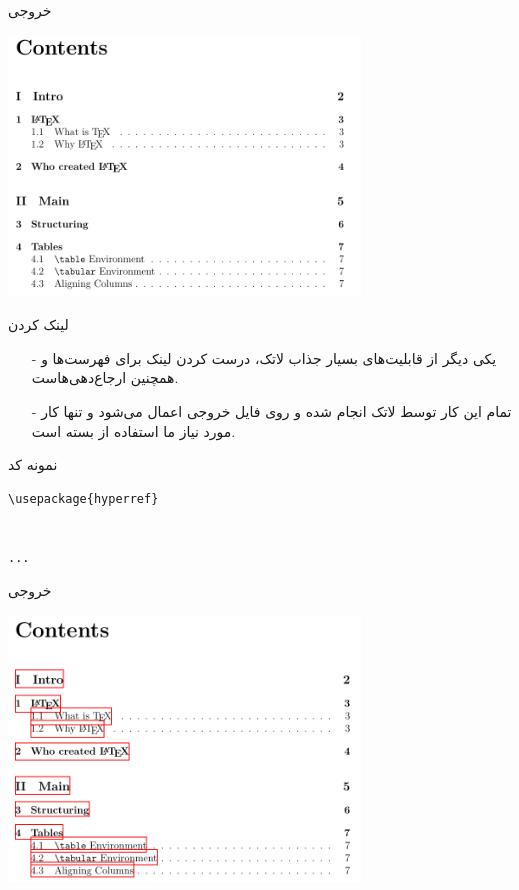 \begin{frame}{خروجی}
\begin{center}
\includegraphics[width=0.7\textwidth, height=0.8\textheight]{docs/images/tab-cont}
\end{center}
\end{frame}

\begin{frame}{لینک کردن}
\begin{itemize}\itemr
\item[-]
یکی دیگر از قابلیت‌های بسیار جذاب لاتک، درست کردن لینک برای فهرست‌ها و همچنین ارجاع‌دهی‌هاست.

\item[-] 
تمام این کار توسط لاتک انجام شده و روی فایل  خروجی اعمال می‌شود و تنها کار مورد نیاز ما استفاده از بسته 
است.
\end{itemize}
\end{frame}

\begin{frame}[fragile]{نمونه کد}
\begin{latin}
\begin{lstlisting}[keywords={begin, end}, keywordstyle=\color{Mulberry}\textbf]
\usepackage{hyperref}


...

\end{lstlisting}
\end{latin}
\end{frame}

\begin{frame}{خروجی}
\begin{center}
\includegraphics[width=0.7\textwidth, height=0.8\textheight]{docs/images/hyperref-simple}
\end{center}
\end{frame}

